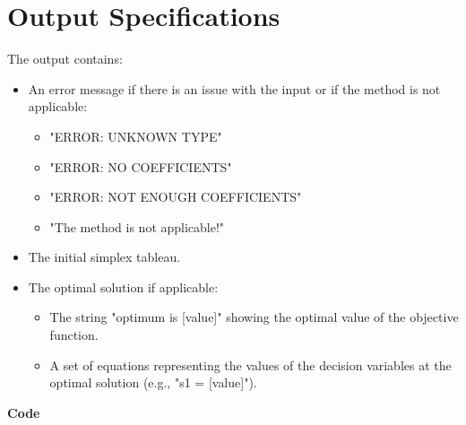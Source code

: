 \documentclass[12pt, legalpaper]{exam}
\begin{document}
\section*{Output Specifications}
The output contains:
\begin{itemize}
    \item An error message if there is an issue with the input or if the method is not applicable:
        \begin{itemize}
            \item "ERROR: UNKNOWN TYPE"
            \item "ERROR: NO COEFFICIENTS"
            \item "ERROR: NOT ENOUGH COEFFICIENTS"
            \item "The method is not applicable!"
        \end{itemize}
    \item The initial simplex tableau.
    \item The optimal solution if applicable:
        \begin{itemize}
            \item The string "optimum is [value]" showing the optimal value of the objective function.
            \item A set of equations representing the values of the decision variables at the optimal solution (e.g., "s1 = [value]").
        \end{itemize}
\end{itemize}

\noindent
{}




\vspace{24pt}
\noindent    
\newpage
\textbf{Code}
\end{document}

